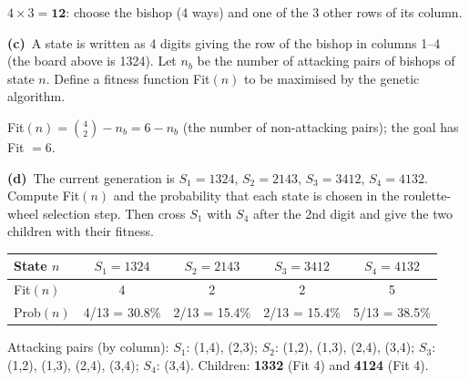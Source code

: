 \documentclass[11pt,a4paper]{article}
\newcommand{\subq}[1]{\par\smallskip\noindent\textbf{#1}\ }
\begin{document}
\begin{solbox}
$4\times3=\mathbf{12}$: choose the bishop (4 ways) and one of the 3 other rows of its column.
\end{solbox}
\subq{(c)}A state is written as 4 digits giving the row of the bishop in columns 1--4 (the board above is 1324). Let $n_b$ be the number of attacking pairs of bishops of state $n$. Define a fitness function Fit$(n)$ to be maximised by the genetic algorithm.
\begin{solbox}
Fit$(n)=\binom42-n_b=6-n_b$ (the number of non-attacking pairs); the goal has Fit $=6$.
\end{solbox}
\subq{(d)}The current generation is $S_1=1324$, $S_2=2143$, $S_3=3412$, $S_4=4132$. Compute Fit$(n)$ and the probability that each state is chosen in the roulette-wheel selection step. Then cross $S_1$ with $S_4$ after the 2nd digit and give the two children with their fitness.
\begin{solbox}
\begin{center}\begin{tabular}{|l|c|c|c|c|}\hline State $n$ & $S_1=1324$ & $S_2=2143$ & $S_3=3412$ & $S_4=4132$\\\hline Fit$(n)$ & \textcolor{blue!60!black}{4} & \textcolor{blue!60!black}{2} & \textcolor{blue!60!black}{2} & \textcolor{blue!60!black}{5}\\\hline Prob$(n)$ & \textcolor{blue!60!black}{4/13 = 30.8\%} & \textcolor{blue!60!black}{2/13 = 15.4\%} & \textcolor{blue!60!black}{2/13 = 15.4\%} & \textcolor{blue!60!black}{5/13 = 38.5\%}\\\hline\end{tabular}\end{center}Attacking pairs (by column): $S_1$: (1,4), (2,3); $S_2$: (1,2), (1,3), (2,4), (3,4); $S_3$: (1,2), (1,3), (2,4), (3,4); $S_4$: (3,4). Children: \textbf{1332} (Fit 4) and \textbf{4124} (Fit 4).
\end{solbox}
\end{document}
